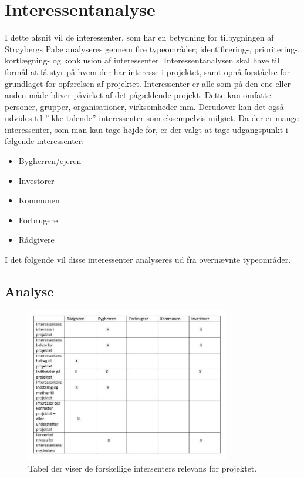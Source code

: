 \chapter{Interessentanalyse}
I dette afsnit vil de interessenter, som har en betydning for tilbygningen af Strøybergs Palæ analyseres gennem fire typeområder; identificering-, prioritering-, kortlægning- og konklusion af interessenter. Interessentanalysen skal have til formål at få styr på hvem der har interesse i projektet, samt opnå forståelse for grundlaget for opførelsen af projektet.
Interessenter er alle som på den ene eller anden måde bliver påvirket af det pågældende projekt. Dette kan omfatte personer, grupper, organisationer, virksomheder mm. Derudover kan det også udvides til ”ikke-talende” interessenter som eksempelvis miljøet. Da der er mange interessenter, som man kan tage højde for, er der valgt at tage udgangspunkt i følgende interessenter:

\begin{itemize}
\item Bygherren/ejeren
\item Investorer
\item Kommunen
\item Forbrugere
\item Rådgivere
\end{itemize}

I det følgende vil disse interessenter analyseres ud fra overnævnte typeområder.

\section{Analyse}

\begin{figure}[H] 
\centering
\includegraphics[width=0.80\textwidth]{billeder/IA1}
\caption{Tabel der viser de forskellige intersenters relevans for projektet.}
\label{fig:IA1}
\end{figure}

